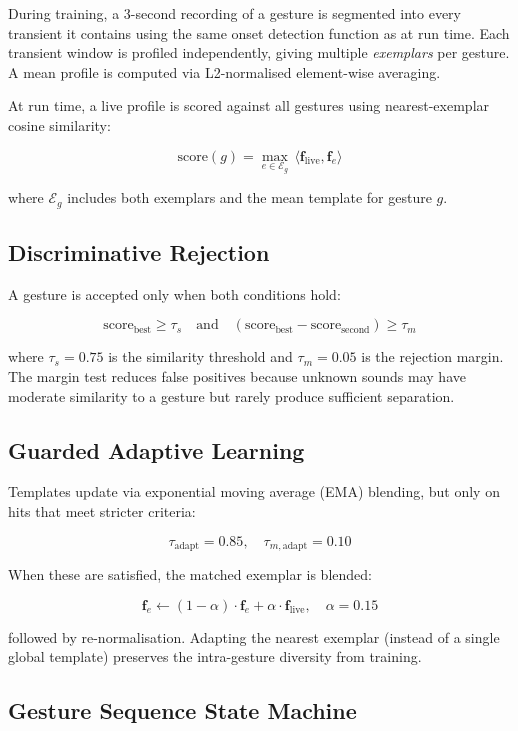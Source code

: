 \documentclass[12pt,a4paper]{article}
\begin{document}
During training, a 3-second recording of a gesture is segmented into every transient it contains using the same onset detection function as at run time. Each transient window is profiled independently, giving multiple \textit{exemplars} per gesture. A mean profile is computed via L2-normalised element-wise averaging.

At run time, a live profile is scored against all gestures using nearest-exemplar cosine similarity:

\[
\text{score}(g) = \max_{e \in \mathcal{E}_g} \, \langle \mathbf{f}_{\text{live}}, \mathbf{f}_e \rangle
\]

where \(\mathcal{E}_g\) includes both exemplars and the mean template for gesture \(g\).

\subsection{Discriminative Rejection}

A gesture is accepted only when both conditions hold:

\[
\text{score}_{\text{best}} \geq \tau_s \quad \text{and} \quad (\text{score}_{\text{best}} - \text{score}_{\text{second}}) \geq \tau_m
\]

where \(\tau_s = 0.75\) is the similarity threshold and \(\tau_m = 0.05\) is the rejection margin. The margin test reduces false positives because unknown sounds may have moderate similarity to a gesture but rarely produce sufficient separation.

\subsection{Guarded Adaptive Learning}

Templates update via exponential moving average (EMA) blending, but only on hits that meet stricter criteria:

\[
\tau_{\text{adapt}} = 0.85, \quad \tau_{m,\text{adapt}} = 0.10
\]

When these are satisfied, the matched exemplar is blended:

\[
\mathbf{f}_{e} \leftarrow (1 - \alpha) \cdot \mathbf{f}_{e} + \alpha \cdot \mathbf{f}_{\text{live}}, \quad \alpha = 0.15
\]

followed by re-normalisation. Adapting the nearest exemplar (instead of a single global template) preserves the intra-gesture diversity from training.

\subsection{Gesture Sequence State Machine}
\end{document}

